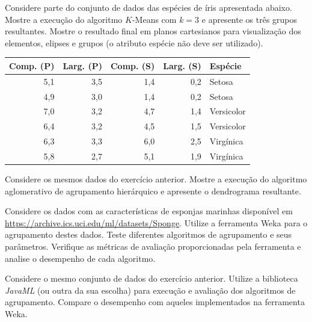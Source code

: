\begin{exercise}
Considere parte do conjunto de dados das espécies de íris apresentada abaixo. Mostre a execução do algoritmo $K$-Means com $k = 3$ e apresente os três grupos resultantes. Mostre o resultado final em planos cartesianos para visualização dos elementos, elipses e grupos (o atributo espécie não deve ser utilizado).

\begin{table}[h]
	\centering
	\begin{tabular}{rrrrl}
		\hline
		\textbf{Comp. (P)} & \textbf{Larg. (P)} & \textbf{Comp. (S)} & \textbf{Larg. (S)} & \textbf{Espécie} \\
		\hline
		5,1 & 3,5 & 1,4 & 0,2 & Setosa \\
		4,9 & 3,0 & 1,4 & 0,2 & Setosa \\
		7,0 & 3,2 & 4,7 & 1,4 & Versicolor \\
		6,4 & 3,2 & 4,5 & 1,5 & Versicolor \\
		6,3 & 3,3 & 6,0 & 2,5 & Virgínica \\
		5,8 & 2,7 & 5,1 & 1,9 & Virgínica \\
		\hline
	\end{tabular}
\end{table}
\end{exercise}

\begin{exercise}
Considere os mesmos dados do exercício anterior. Mostre a execução do algoritmo aglomerativo de agrupamento hierárquico e apresente o dendrograma resultante.
\end{exercise}

\begin{exercise}
Considere os dados com as características de esponjas marinhas disponível em \url{https://archive.ics.uci.edu/ml/datasets/Sponge}. Utilize a ferramenta Weka para o agrupamento destes dados. Teste diferentes algoritmos de agrupamento e seus parâmetros. Verifique as métricas de avaliação proporcionadas pela ferramenta e analise o desempenho de cada algoritmo.
\end{exercise}

\begin{exercise}
Considere o mesmo conjunto de dados do exercício anterior. Utilize a biblioteca \textit{JavaML} (ou outra da sua escolha) para execução e avaliação dos algoritmos de agrupamento. Compare o desempenho com aqueles implementados na ferramenta Weka.
\end{exercise}

